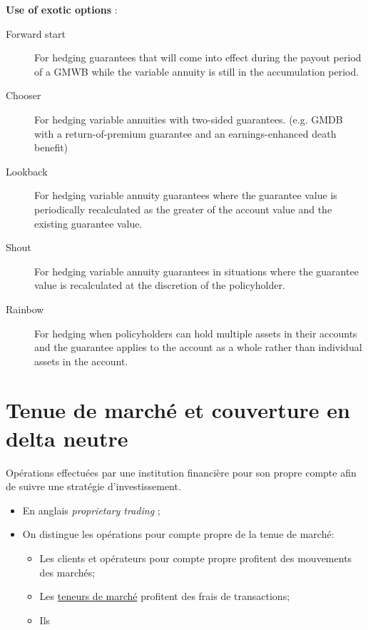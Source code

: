 \documentclass[10pt, french]{article}
\begin{document}
\begin{multicols*}{2}
\textbf{Use of exotic options }: 
\begin{description}
	\item[Forward start]	For hedging guarantees that will come into effect during the payout period of a GMWB while the variable annuity is still in the accumulation period.
	\item[Chooser]	For hedging variable annuities with two-sided guarantees. (e.g. GMDB with a return-of-premium guarantee and an earnings-enhanced death benefit)
	\item[Lookback]	For hedging variable annuity guarantees where the guarantee value is periodically recalculated as the greater of the account value and the existing guarantee value.
	\item[Shout]	For hedging variable annuity guarantees in situations where the guarantee value is recalculated at the discretion of the policyholder.
	\item[Rainbow]	For hedging when policyholders can hold multiple assets in their accounts and the guarantee applies to the account as a whole rather than individual assets in the account.
\end{description}


\newpage
\section{Tenue de marché et couverture en delta neutre}

\begin{definitionNOHFILL}
Opérations effectuées par une institution financière pour son propre compte afin de suivre une stratégie d'investissement.

\begin{itemize}[leftmargin = *]
\item	En anglais \og \textit{proprietary trading} \fg{};
\item	On distingue les opérations pour compte propre de la tenue de marché:
	\begin{itemize}[leftmargin = *]
	\item	Les clients et opérateurs pour compte propre profitent des mouvements des marchés;
	\item	Les \hyperlink{market_holder}{\color{blue}teneurs de marché} profitent des frais de transactions;
	\item	Ils  
	\end{itemize}
\end{itemize}
\end{definitionNOHFILL}


\end{multicols*}
\end{document}
